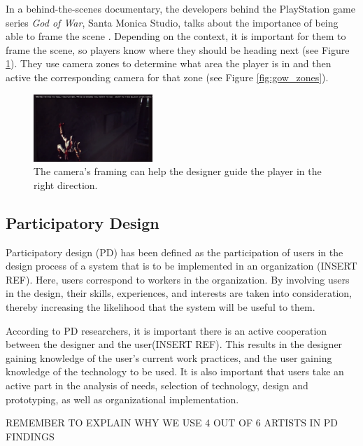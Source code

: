 In a behind-the-scenes documentary, the developers behind the PlayStation game series \textit{God of War}, Santa Monica Studio, talks about the importance of being able to frame the scene \cite{gow_camera}. Depending on the context, it is important for them to frame the scene, so players know where they should be heading next (see Figure \ref{fig:gow_jump}). They use camera zones to determine what area the player is in and then active the corresponding camera for that zone (see Figure \ref{fig:gow_zones}).

\begin{figure}[htbp]
\centering
\includegraphics[width=0.40\textwidth]{Pics/gow_next}
\caption{The camera's framing can help the designer guide the player in the right direction.}
\label{fig:gow_jump}
\end{figure}



\subsection{Participatory Design}
Participatory design (PD) has been defined as the participation of users in the design process of a system that is to be implemented in an organization (INSERT REF). Here, users correspond to workers in the organization. By involving users in the design, their skills, experiences, and interests are taken into consideration, thereby increasing the likelihood that the system will be useful to them.

According to PD researchers, it is important there is an active cooperation between the designer and the user(INSERT REF). This results in the designer gaining knowledge of the user's current work practices, and the user gaining knowledge of the technology to be used. It is also important that users take an active part in the analysis of needs, selection of technology, design and prototyping, as well as organizational implementation.

REMEMBER TO EXPLAIN WHY WE USE 4 OUT OF 6 ARTISTS IN PD FINDINGS